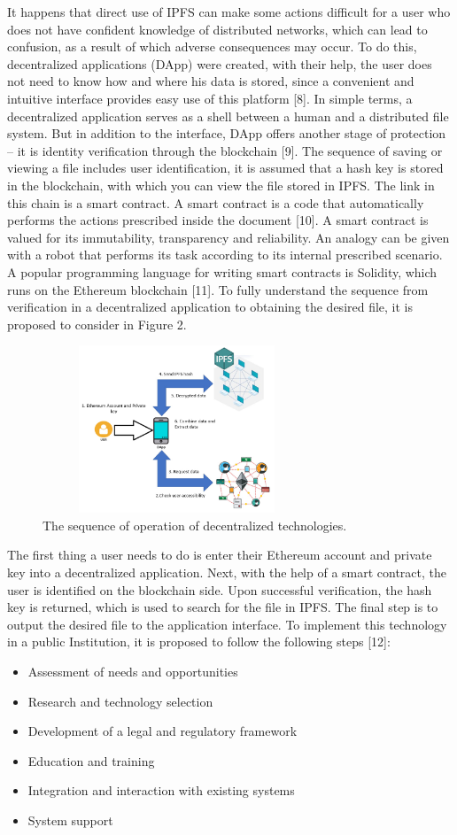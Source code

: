 \documentclass[10pt,conference,a4paper]{IEEEtran_EDM}
\begin{document}
It happens that direct use of IPFS can make some actions difficult for a user who does not have confident knowledge of distributed networks, which can lead to confusion, as a result of which adverse consequences may occur. To do this, decentralized applications (DApp) were created, with their help, the user does not need to know how and where his data is stored, since a convenient and intuitive interface provides easy use of this platform [8]. In simple terms, a decentralized application serves as a shell between a human and a distributed file system. But in addition to the interface, DApp offers another stage of protection – it is identity verification through the blockchain [9]. The sequence of saving or viewing a file includes user identification, it is assumed that a hash key is stored in the blockchain, with which you can view the file stored in IPFS. The link in this chain is a smart contract. A smart contract is a code that automatically performs the actions prescribed inside the document [10]. A smart contract is valued for its immutability, transparency and reliability. An analogy can be given with a robot that performs its task according to its internal prescribed scenario. A popular programming language for writing smart contracts is Solidity, which runs on the Ethereum blockchain [11]. To fully understand the sequence from verification in a decentralized application to obtaining the desired file, it is proposed to consider in Figure 2.
\begin{figure}
\includegraphics[width=8cm, height=5cm]{fig2.png}
\caption{The sequence of operation of decentralized technologies.}
\label{fig}
\end{figure}

The first thing a user needs to do is enter their Ethereum account and private key into a decentralized application. Next, with the help of a smart contract, the user is identified on the blockchain side. Upon successful verification, the hash key is returned, which is used to search for the file in IPFS. The final step is to output the desired file to the application interface. 
To implement this technology in a public Institution, it is proposed to follow the following steps [12]:
\begin{itemize}
\item Assessment of needs and opportunities
\item  Research and technology selection
\item Development of a legal and regulatory framework
\item Education and training
\item Integration and interaction with existing systems
\item System support
\end{itemize}
\end{document}

